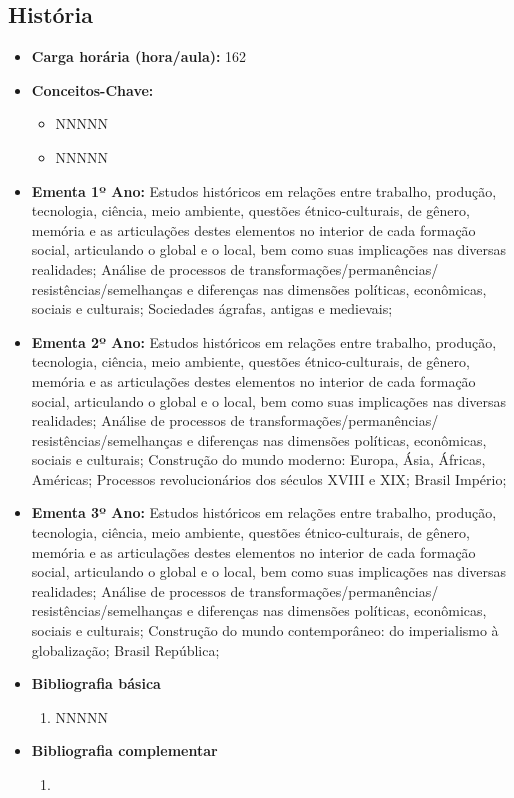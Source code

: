 \documentclass[11pt,fleqn]{book} %
\begin{document}
\subsection{História}\label{disc:historia}
\begin{itemize}
	\item \textbf{Carga horária (hora/aula):} 162
	\item \textbf{Conceitos-Chave:}
	\begin{itemize}
		\item NNNNN
		\item NNNNN
	\end{itemize}
	\item \textbf{Ementa 1º Ano:} 
	Estudos históricos em relações entre trabalho, produção, tecnologia, ciência, meio ambiente, questões étnico-culturais, de gênero, memória e as articulações destes elementos no interior de cada formação social, articulando o global e o local, bem como suas implicações nas diversas realidades; 
	Análise de processos de transformações/permanências/ resistências/semelhanças e diferenças nas dimensões políticas, econômicas, sociais e culturais;
	Sociedades ágrafas, antigas e medievais;
	\item \textbf{Ementa 2º Ano:} 
	Estudos históricos em relações entre trabalho, produção, tecnologia, ciência, meio ambiente, questões étnico-culturais, de gênero, memória e as articulações destes elementos no interior de cada formação social, articulando o global e o local, bem como suas implicações nas diversas realidades; 
    Análise de processos de transformações/permanências/ resistências/semelhanças e diferenças nas dimensões políticas, econômicas, sociais e culturais;		
	Construção do mundo moderno: Europa, Ásia, Áfricas, Américas;
	Processos revolucionários dos séculos XVIII e XIX; 
	Brasil Império;
	\item \textbf{Ementa 3º Ano:} 
	Estudos históricos em relações entre trabalho, produção, tecnologia, ciência, meio ambiente, questões étnico-culturais, de gênero, memória e as articulações destes elementos no interior de cada formação social, articulando o global e o local, bem como suas implicações nas diversas realidades; 
	Análise de processos de transformações/permanências/ resistências/semelhanças e diferenças nas dimensões políticas, econômicas, sociais e culturais;			
	Construção do mundo contemporâneo: do imperialismo à globalização; 
	Brasil República;
	\item \textbf{Bibliografia básica}
	\begin{enumerate}
		\item NNNNN
	\end{enumerate}
	\item \textbf{Bibliografia complementar}
	\begin{enumerate}
		\item 
	\end{enumerate}	
\end{itemize}
\end{document}
